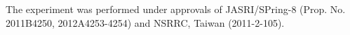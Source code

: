 \documentclass[twocolumn,showpacs,showkeys,fleqn,prl,superscriptaddress]{revtex4}%
\newcommand{\nn}[1]{\textnormal{ #1}}
\begin{document}
%



The experiment was performed under approvals of JASRI/SPring-8 (Prop. No. 2011B4250, 2012A4253-4254) and NSRRC, Taiwan (2011-2-105).
 
       

%
%



\end{document}

